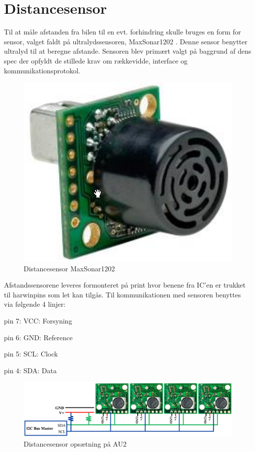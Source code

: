 \section{Distancesensor} \label{sec:hw_design_distancesensor}

Til at måle afstanden fra bilen til en evt. forhindring skulle bruges en form for sensor, valget faldt på ultralydssensoren, MaxSonar1202 \cite{lib:maxsonar}. 
Denne sensor benytter ultralyd til at beregne afstande.
Sensoren blev primært valgt på baggrund af dens spec der opfyldt de stillede krav om rækkevidde, interface og kommunikationsprotokol. 

\begin{figure}[ht]
	\centering
	\includegraphics[scale=0.4]{../fig/billeder/distancesensor.png}
	\caption{Distancesensor MaxSonar1202}
	\label{fig:ds_pic}
\end{figure}

Afstandssensorene leveres formonteret på print hvor benene fra IC'en er trukket til harwinpins som let kan tilgås. Til kommunikationen med sensoren benyttes \IIC via følgende 4 linjer: \\

\begin{packed_item}
	\item pin 7: VCC: Forsyning
	\item pin 6: GND: Reference
	\item pin 5: SCL: Clock
	\item pin 4: SDA: Data
\end{packed_item}

\begin{figure}[ht]
	\centering
	\includegraphics[scale=0.45]{../fig/billeder/distancesensor_multi.png}
	\caption{Distancesensor opsætning på AU2}
	\label{fig:ds_multi}
\end{figure}

